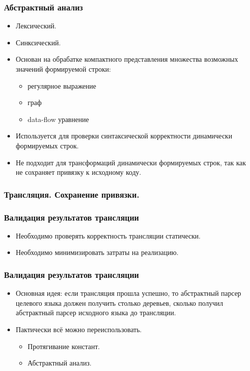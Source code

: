 \documentclass{beamer}
\begin{document}
\begin{frame}
	\transwipe[direction=90]
	\frametitle{Абстрактный анализ}
	\begin{itemize}
		\item Лексический.
		\item Синксический.
		\item Основан на обрабатке компактного представления множества возможных значений формируемой строки:
	    	\begin{itemize}
	            \item регулярное выражение
	            \item граф
	            \item data-flow уравнение
            \end{itemize}
		\item Используется для проверки синтаксической корректности динамически формируемых строк.
		\item Не подходит для трансформаций динамически формируемых строк, так как не сохраняет привязку к исходному коду.
	\end{itemize}
\end{frame}

\begin{frame}
	\transwipe[direction=90]
	\frametitle{Трансляция. Сохранение привязки.}
	
\end{frame}

\begin{frame}
	\transwipe[direction=90]
	\frametitle{Валидация результатов трансляции}
	\begin{itemize}
		\item Необходимо проверять корректность трансляции статически.
		\item Необходимо минимизировать затраты на реализацию.
    \end{itemize}
\end{frame}

\begin{frame}
	\transwipe[direction=90]
	\frametitle{Валидация результатов трансляции}
	\begin{itemize}
	    \item Основная идея: если трансляция прошла успешно, то абстрактный парсер целевого языка должен получить столько деревьев, сколько получил абстрактный парсер исходного языка до трансляции.
        \item Пактически всё можно переиспользовать.
        \begin{itemize}
	        \item Протягивание констант.
            \item Абстрактный анализ.
	    \end{itemize}
	\end{itemize}
\end{frame}
\end{document}
